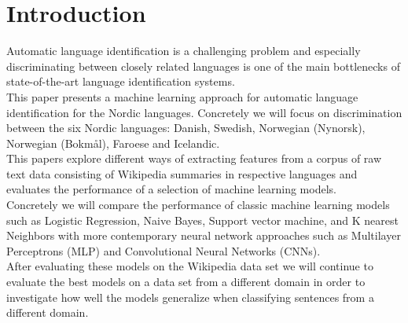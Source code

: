 \section{Introduction}
Automatic language identification is a challenging problem and especially discriminating between closely related languages is one of the main bottlenecks of state-of-the-art language identification systems.\cite{DSL2014}\\

This paper presents a machine learning approach for automatic language identification for the Nordic languages. Concretely we will focus on discrimination between the six Nordic languages: Danish, Swedish, Norwegian (Nynorsk), Norwegian (Bokmål), Faroese and Icelandic.\\

This papers explore different ways of extracting features from a corpus of raw text data consisting of Wikipedia summaries in respective languages and evaluates the performance of a selection of machine learning models.\\

Concretely we will compare the performance of classic machine learning models such as Logistic Regression, Naive Bayes, Support vector machine, and K nearest Neighbors with more contemporary neural network approaches such as Multilayer Perceptrons (MLP) and Convolutional Neural Networks (CNNs).\\

After evaluating these models on the Wikipedia data set we will continue to evaluate the best models on a data set from a different domain in order to investigate how well the models generalize when classifying sentences from a different domain.
